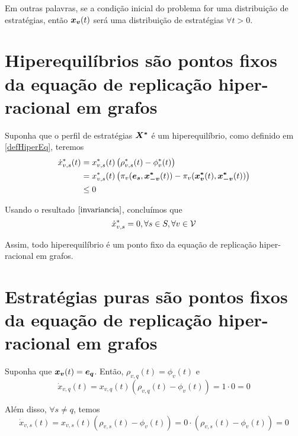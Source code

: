 Em outras palavras, se a condição inicial do problema for uma distribuição de estratégias, então $\boldsymbol{x_v}(t)$ será uma distribuição de estratégias $\forall t>0$.


\section{Hiperequilíbrios são pontos fixos da equação de replicação hiper-racional em grafos}

Suponha que o perfil de estratégias $\boldsymbol{X^*}$ é um hiperequilíbrio, como definido em \ref{defHiperEq}, teremos
\begin{equation}
\begin{split}
    \Dot{x}_{v,s}^*(t)&=x_{v,s}^*(t)\left(\rho_{v,s}^*(t)-\phi_v^*(t)\right)\\
                      &=x_{v,s}^*(t)\left(\pi_v(\boldsymbol{e_s},\boldsymbol{x^*_{-v}}(t))
                      -\pi_v(\boldsymbol{x^*_v}(t),\boldsymbol{x^*_{-v}}(t))\right)\\
                      &\leq 0
\end{split}
\end{equation}

Usando o resultado $\eqref{invariancia}$, concluímos que 
\begin{equation}
    \Dot{x}_{v,s}^*=0,\forall s\in S,\forall v\in\mathcal{V}
\end{equation}

Assim, todo hiperequilíbrio é um ponto fixo da equação de replicação hiper-racional em grafos.


\section{Estratégias puras são pontos fixos da equação de replicação hiper-racional em grafos}

Suponha que $\boldsymbol{x_v}(t)=\boldsymbol{e_q}$. Então, $\rho_{v,q}(t)=\phi_v(t)$ e
\begin{equation}
    \Dot{x}_{v,q}(t)=x_{v,q}(t)\left(\rho_{v,q}(t)-\phi_v(t)\right)
                      =1\cdot 0 = 0
\end{equation}

Além disso, $\forall s\neq q$, temos
\begin{equation}
    \Dot{x}_{v,s}(t)=x_{v,s}(t)\left(\rho_{v,s}(t)-\phi_v(t)\right)
                      =0\cdot \left(\rho_{v,s}(t)-\phi_v(t)\right) = 0
\end{equation}

